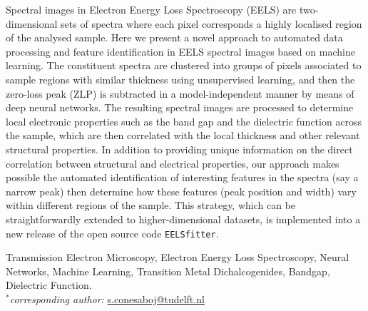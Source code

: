 \documentclass[12pt,a4paper]{article}
\numberwithin{equation}{section}
\numberwithin{figure}{section}
\numberwithin{table}{section}
\begin{document}
Spectral images in Electron Energy Loss Spectroscopy (EELS) are two-dimensional
sets of spectra where each pixel corresponds a highly localised region of the analysed sample.
%
Here we present a novel approach to automated data processing and feature identification
in EELS spectral images based on machine learning.
%
The constituent spectra are clustered into groups of pixels associated
to sample regions with similar thickness using unsupervised learning,
and then the zero-loss peak (ZLP) is subtracted in a model-independent manner
by means of deep neural networks.
%
The resulting spectral images are  processed to determine 
local electronic properties such as
the band gap and the dielectric function across the sample,
which are then correlated  with the local thickness and other
relevant structural properties.
%
In addition to providing unique information on the direct correlation
between structural and electrical properties, our approach makes possible
the automated identification of interesting features
in the spectra (say a narrow peak)  then determine
how these features  (peak position and width) vary within different regions of the
sample.
%
This strategy, which can be straightforwardly extended
to higher-dimensional datasets,
is implemented into a new release of the open source
code {\tt EELSfitter}.


\vspace{0.4cm}
 {\small Transmission Electron Microscopy,
Electron Energy Loss Spectroscopy, Neural Networks, Machine Learning, Transition
Metal Dichalcogenides, Bandgap, Dielectric Function.}\\

\noindent
{\it $^{*}$corresponding author:} \url{s.conesaboj@tudelft.nl}

\clearpage
\tableofcontents









%
\end{document}
